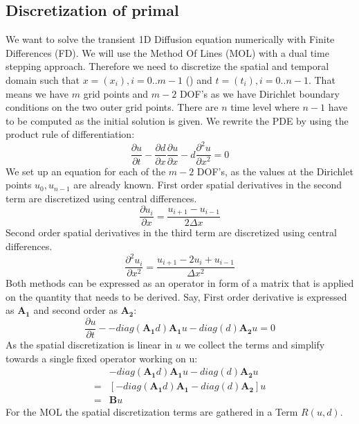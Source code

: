 \documentclass[10pt]{article}
\begin{document}
\subsection{Discretization of primal}
We want to solve the transient 1D Diffusion equation numerically with Finite Differences (FD). We will use the Method Of Lines (MOL) with a dual time stepping approach. Therefore we need to discretize the spatial and temporal domain such that $x=(x_i), i=0..m-1$ () and $t=(t_i), i=0 .. n-1$. That means we have $m$ grid points and $m-2$ DOF's as we have Dirichlet boundary conditions on the two outer grid points. There are $n$ time level where $n-1$ have to be computed as the initial solution is given. We rewrite the PDE by using the product rule of differentiation:
\begin{equation}
\frac{\partial u}{\partial t} - \frac{\partial d}{\partial x}\frac{\partial u}{\partial x} -d \frac{\partial^2 u}{\partial x^2}  = 0
\end{equation}
We set up an equation for each of the $m-2$ DOF's, as the values at the Dirichlet points $u_0, u_{n-1}$ are already known. First order spatial derivatives in the second term are discretized using central differences.
\begin{equation}
\frac{\partial u_i}{\partial x} = \frac{u_{i+1} - u_{i-1}}{2\Delta x}
\end{equation}
Second order spatial derivatives in the third term are discretized using central differences.
\begin{equation}
\frac{\partial^2 u_i}{\partial x^2} = \frac{u_{i+1} - 2 u_{i} + u_{i-1}}{\Delta x^2}
\end{equation}
Both methods can be expressed as an operator in form of a matrix that is applied on the quantity that needs to be derived. Say, First order derivative is expressed as $\mathbf{A_1}$ and second order as $\mathbf{A_2}$:
\begin{equation}
\frac{\partial u}{\partial t} - -diag(\mathbf{A_1}d)\mathbf{A_1}u - diag(d) \mathbf{A_2}u = 0
\end{equation}
As the spatial discretization is linear in $u$ we collect the terms and simplify towards a single fixed operator working on u:
\begin{align}
&-diag(\mathbf{A_1}d)\mathbf{A_1}u - diag(d) \mathbf{A_2}u \\
=&\left[ -diag(\mathbf{A_1}d)\mathbf{A_1} - diag(d) \mathbf{A_2} \right]u \\
=& \mathbf{B}u
\end{align}
For the MOL the spatial discretization terms are gathered in a Term $R(u,d)$.
\end{document}
